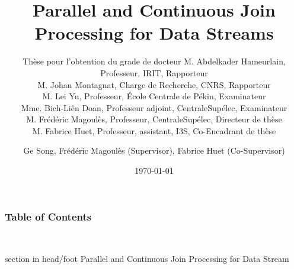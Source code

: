 \documentclass{beamer}
\title[Parallel and Continuous Join Processing for Data Streams]{Parallel and Continuous Join Processing for Data Streams}
\subtitle{
Thèse pour l’obtention du grade de docteur
}
\subtitle{
M. Abdelkader Hameurlain, Professeur, IRIT, Rapporteur \\
M. Johan Montagnat, Charge de Recherche, CNRS, Rapporteur \\
M. Lei Yu, Professeur, École Centrale de Pékin, Examinateur \\
Mme. Bich-Liên Doan, Professeur adjoint, CentraleSupélec, Examinateur \\
M. Frédéric Magoulès, Professeur, CentraleSupélec, Directeur de thèse \\
M. Fabrice Huet, Professeur, assistant, I3S, Co-Encadrant de thèse
}
\author[G. Song]{
Ge Song, Frédéric Magoulès (Supervisor), Fabrice Huet (Co-Supervisor) }
\institute[CentraleSupélec]{
Lab MICS\\
  CentraleSupélec \\
  Université Paris-Saclay}
\date[\today]{
 \today}
\begin{document}
\begin{frame}
  \titlepage
\end{frame}

\begin{frame}
  \frametitle{Table of Contents}

  \tableofcontents
\end{frame}





%

\begin{frame}[plain, b]
\centering
\huge \textcolor{white}{Thank You!}
\normalsize

\vspace*{\fill}

 \begin{beamercolorbox}[wd=\paperwidth]{section in head/foot}
 \centering
Parallel and Continuous Join Processing for Data Stream
\vskip10pt
\end{beamercolorbox}
 \end{frame}
\end{document}
